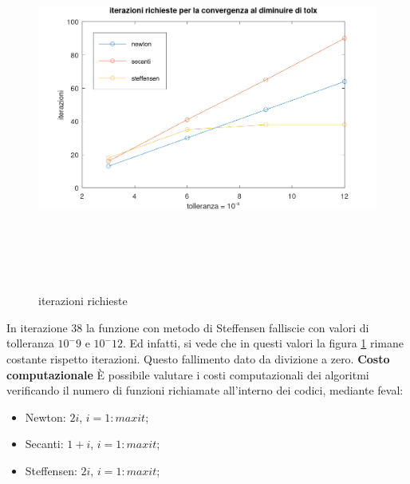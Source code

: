 \begin{figure}[!ht]
        \includegraphics[width=16cm,height=12cm,keepaspectratio]{capitolo2/es7_figure.png}
        \caption{iterazioni richieste}
        \label{fig:es7}
\end{figure}
\newline
In iterazione $38$ la funzione con metodo di Steffensen falliscie con valori di tolleranza
$10^-9$ e $10^-12$. Ed infatti, si vede che in questi valori la figura \ref{fig:es7}
rimane costante rispetto iterazioni. Questo fallimento dato da divizione a zero.
\newline \textbf{Costo computazionale} \newline
È possibile valutare i costi computazionali dei algoritmi verificando il numero
di funzioni richiamate all'interno dei codici, mediante feval:
\begin{itemize}
        \item Newton: $2i$, $i=1:maxit$;
        \item Secanti: $1 + i$, $i=1:maxit$;
        \item Steffensen: $2i$, $i=1:maxit$;
\end{itemize}

